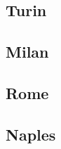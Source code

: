 \documentclass[a4paper,11pt]{article}
\begin{document}
\subsection{Turin}
\subsection{Milan}
\subsection{Rome}
\subsection{Naples}
\appendix


\acknowledgements




\end{document}
